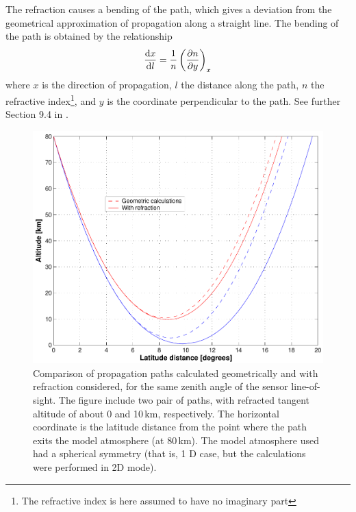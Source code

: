 The refraction causes a bending of the path, which gives a deviation
from the geometrical approximation of propagation along a straight
line. The bending of the path is obtained by the relationship
\begin{equation}
  \frac{\mathrm{d} x}{\mathrm{d} l} = \frac{1}{n} \left( \frac{\partial n}{\partial y} \right)_x
  \label{eq:ppath:refrbend}
\end{equation}
where $x$ is the direction of propagation, $l$ the distance along the
path, $n$ the refractive index\footnote{The refractive index is here
  assumed to have no imaginary part}, and $y$ is the coordinate
perpendicular to the path. See further Section 9.4 in
\citet{rodgers:00}.

\begin{figure}[!p]
 \begin{center}
  \includegraphics*[width=0.70\hsize]{ppath_refr1}
  \caption{Comparison of propagation paths calculated geometrically and 
    with refraction considered, for the same zenith angle of the
    sensor line-of-sight. The figure include two pair of paths, with
    refracted tangent altitude of about 0 and 10\,km, respectively.
    The horizontal coordinate is the latitude distance from the point
    where the path exits the model atmosphere (at 80\,km). The model
    atmosphere used had a spherical symmetry (that is, 1 D case, but
    the calculations were performed in 2D mode).}
  \label{fig:ppath:ppath_refr1}  
 \end{center}
\end{figure}


